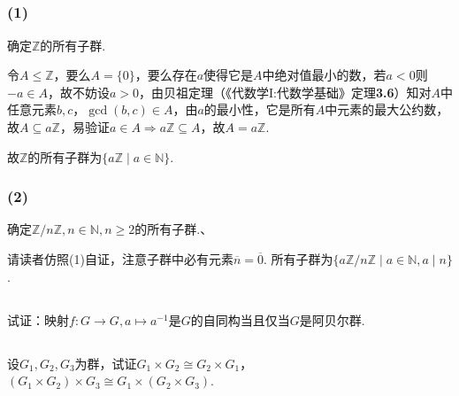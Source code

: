 
\subsection{}
\subsubsection{(1)}
确定$\mathbb{Z}$的所有子群.

\jie 令$A\leq \mathbb{Z}$，要么$A=\{0\}$，要么存在$a$使得它是$A$中绝对值最小的数，若$a<0$则$-a\in A$，故不妨设$a>0$，由贝祖定理（{\heiti 《代数学I:代数学基础》定理}\textbf{3.6}）知对$A$中任意元素$b,c$，$\gcd(b,c)\in A$，由$a$的最小性，它是所有$A$中元素的最大公约数，故$A\subseteq a\mathbb{Z}$，易验证$a\in A\Rightarrow a\mathbb{Z}\subseteq A$，故$A=a\mathbb{Z}$.

故$\mathbb{Z}$的所有子群为$\{a\mathbb{Z}\mid a\in\mathbb{N}\}$.

\subsubsection{(2)}
确定$\mathbb{Z}/n\mathbb{Z}, n\in\mathbb{N}, n\geq 2$的所有子群.、

\jie 请读者仿照(1)自证，注意子群中必有元素$\overline{n}=\overline{0}$. 所有子群为$\{a\mathbb{Z}/n\mathbb{Z}\mid a\in\mathbb{N}, a\mid n\}$.

\subsection{}
试证：映射$f: G\rightarrow G, a\mapsto a^{-1}$是$G$的自同构当且仅当$G$是阿贝尔群.


\subsection{}
设$G_1, G_2, G_3$为群，试证$G_1\times G_2\cong G_2\times G_1$，
$(G_1\times G_2)\times G_3\cong G_1\times(G_2\times G_3)$.

